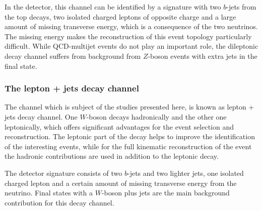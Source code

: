  In the detector, this channel can be identified by a  signature with two $b$-jets from the top decays, two isolated charged leptons of opposite charge and a large amount of missing transverse energy, which is  a consequence of the two neutrinos.
The missing energy makes the reconstruction of this event topology particularly difficult. While QCD-multijet events do not play an important role, the dileptonic decay channel suffers from background from $Z$-boson events with extra jets in the final state.   

\subsubsection{The lepton + jets  decay channel}
The channel which is subject of the studies presented here, is  known as lepton + jets decay channel. One $W$-boson decays hadronically and  the other one leptonically, which offers significant advantages for the event selection and reconstruction. The leptonic  part of the decay helps to improve the identification of the interesting   events, while for the full kinematic reconstruction of the event the hadronic contributions are used in addition to the leptonic decay. 

 The detector signature consists of two $b$-jets and two lighter jets, one isolated charged lepton and a certain amount of missing transverse energy from the neutrino. Final states with a $W$-boson plus jets are the main background contribution for this decay channel.   
  

 
 \vspace{0.5cm} 
  
  
  
  
  
  
  
  
  
